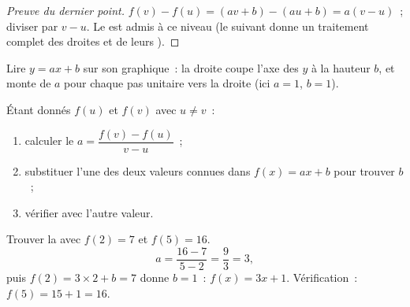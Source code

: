 \begin{proof}[Preuve du dernier point]
$f(v) - f(u) = (av + b) - (au + b) = a(v - u)$~; diviser par $v - u$. Le
 est admis à ce niveau (le  suivant donne un traitement
complet des droites et de leurs ).
\end{proof}

\begin{omfigure}

{\small Lire $y = ax + b$ sur son graphique~: la droite coupe l'axe des
$y$ à la hauteur $b$, et monte de $a$ pour chaque pas unitaire vers la
droite (ici $a = 1$, $b = 1$).}
\end{omfigure}

\begin{method}\label{met:g9:linfunc:findaffine}
Étant donnés $f(u)$ et $f(v)$ avec $u \neq v$~:
\begin{enumerate}
  \item calculer le 
        $a = \dfrac{f(v) - f(u)}{v - u}$~;
  \item substituer l'une des deux valeurs connues dans $f(x) = ax + b$
        pour trouver $b$~;
  \item vérifier avec l'autre valeur.
\end{enumerate}
\end{method}

\begin{example}\label{ex:g9:linfunc:findaffine}
Trouver la  avec $f(2) = 7$ et $f(5) = 16$.
\[
a = \frac{16 - 7}{5 - 2} = \frac93 = 3 ,
\]
puis $f(2) = 3 \times 2 + b = 7$ donne $b = 1$~: $f(x) = 3x + 1$.
Vérification~: $f(5) = 15 + 1 = 16$.
\end{example}

